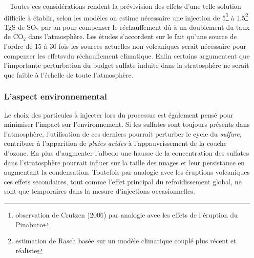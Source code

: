 \documentclass[12pt, letterpaper, twoside]{article}
\begin{document}
\ \linebreak
Toutes ces considérations rendent la prévivision des effets d'une telle solution difficile à établir, selon les modèles on estime nécessaire une injection de 5\footnote{observation de Crutzen (2006) par analogie avec les effets de l'éruption du Pinabuto} à 1.5\footnote{estimation de Rasch basée sur un modèle climatique couplé plus récent et réaliste} TgS de SO$_2$ par an pour compenser le réchauffement dû à un doublement du taux de CO$_2$ dans l'atmosphère. Les études s'accordent sur le fait qu'une source de l'ordre de 15 à 30 fois les sources actuelles non volcaniques serait nécessaire pour compenser les effetsvdu réchauffement climatique. Enfin certains argumentent que l'importante perturbation du budget sulfate induite dans la stratosphère ne serait que faible à l'échelle de toute l'atmosphère. 
\subsubsection{L'aspect environnemental}
Le choix des particules à injecter lors du processus est également pensé pour minimiser l'impact sur l'environnement. Si les sulfates sont toujours présents dans l'atmosphère, l'utilisation de ces derniers pourrait perturber le cycle du \emph{sulfure}, contribuer à l'apparition de \emph{pluies acides} à l'appauvrissement de la couche d'ozone. En plus d'augmenter l'albedo une hausse de la concentration des sulfates dans l'stratosphère pourrait influer sur la taille des nuages et leur persistance en augmentant la condensation. Toutefois par analogie avec les éruptions volcaniques ces effets secondaires, tout comme l'effet principal du refroidissement global, ne sont que temporaires dans la mesure d'injections occasionnelles.
\end{document}
